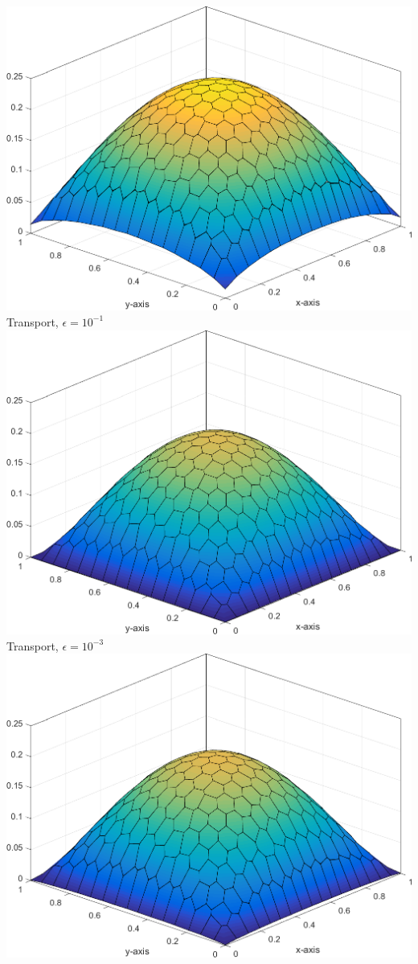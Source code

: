\documentclass[compress,10pt]{beamer}
\begin{document}
\begin{frame}[t]
{\begin{columns}
\centering
{}\includegraphics[width=0.75\columnwidth]{images/Sq_poly_MAXENT_k=1_ep=1e-1.png}\\
Transport, $\epsilon=10^{-1}$
{}\includegraphics[width=0.75\columnwidth]{images/Sq_poly_MAXENT_k=1_ep=1e-3.png}\\
Transport, $\epsilon=10^{-3}$
\centering
{}\includegraphics[width=0.75\columnwidth]{images/Sq_poly_MAXENT_k=1_ep=1e-2.png}\\

\end{columns}}
\end{frame}
\end{document}
